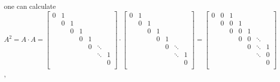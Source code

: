 \documentclass[letterpaper,10pt,english]{jupyterBook}
\begin{document}
\sphinxAtStartPar
one can calculate
\(A^2 = A \cdot A =  
\left[ {\begin{array}{ccccccc}
    0 & 1 &  &  &  &  & \\
     & 0 & 1 &  &  &  &\\
     &  & 0 & 1 &  &  &\\
     &  &  & 0 & 1 &  &\\
     &  &  &  & 0 & \ddots &  \\
     &  &  &  &  & \ddots & 1 \\
     &  &  &  &  &  & 0 \\
\end{array} } \right]  \cdot 
\left[ {\begin{array}{ccccccc}
    0 & 1 &  &  &  &  & \\
     & 0 & 1 &  &  &  &\\
     &  & 0 & 1 &  &  &\\
     &  &  & 0 & 1 &  &\\
     &  &  &  & 0 & \ddots &  \\
     &  &  &  &  & \ddots & 1 \\
     &  &  &  &  &  & 0 \\
\end{array} } \right]  =   
\left[ {\begin{array}{ccccccc}
    0 & 0 & 1 &  &  &  & \\
     & 0 & 0 & 1 &  &  &\\
     &  & 0 & 0 & 1 &  &\\
     &  &  & 0 & 0 & \ddots &\\
     &  &  &  & 0 & \ddots & 1 \\
     &  &  &  &  & \ddots & 0 \\
     &  &  &  &  &  & 0 \\
\end{array} } \right] \),
\end{document}
